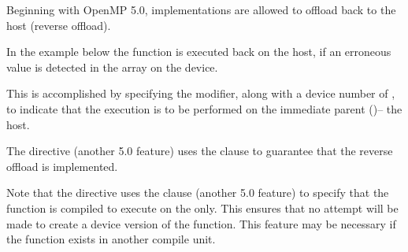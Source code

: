 
Beginning with OpenMP 5.0, implementations are allowed to
offload back to the host (reverse offload).

In the example below the  function
is executed back on the host, if an erroneous value is
detected in the  array on the device.

This is accomplished by specifying the 
 modifier, along with a device number of ,
to indicate that the execution is to be performed on the
immediate parent ()-- the host.

The  directive (another 5.0 feature)
uses the  clause to guarantee
that the reverse offload is implemented.

Note that the  directive uses the
 clause (another 5.0 feature) to specify that
the  function is compiled to
execute on the  only. This ensures that no
attempt will be made to create a device version of the
function.  This feature may be necessary if the function
exists in another compile unit.



